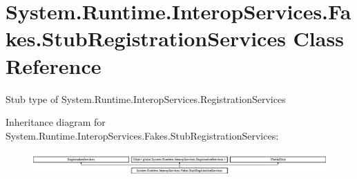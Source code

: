 \hypertarget{class_system_1_1_runtime_1_1_interop_services_1_1_fakes_1_1_stub_registration_services}{\section{System.\-Runtime.\-Interop\-Services.\-Fakes.\-Stub\-Registration\-Services Class Reference}
\label{class_system_1_1_runtime_1_1_interop_services_1_1_fakes_1_1_stub_registration_services}
}


Stub type of System.\-Runtime.\-Interop\-Services.\-Registration\-Services 


Inheritance diagram for System.\-Runtime.\-Interop\-Services.\-Fakes.\-Stub\-Registration\-Services\-:\begin{figure}[H]
\begin{center}
\leavevmode
\includegraphics[height=0.908354cm]{class_system_1_1_runtime_1_1_interop_services_1_1_fakes_1_1_stub_registration_services}
\end{center}
\end{figure}
